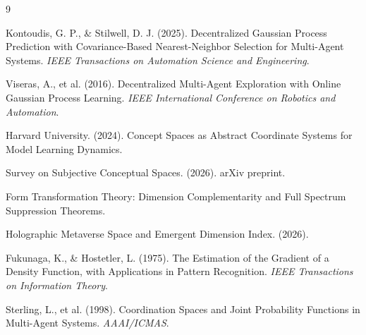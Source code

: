 \documentclass[11pt]{article}
\begin{document}
\begin{thebibliography}{9}

Kontoudis, G. P., \& Stilwell, D. J. (2025). Decentralized Gaussian Process Prediction with Covariance-Based Nearest-Neighbor Selection for Multi-Agent Systems. \textit{IEEE Transactions on Automation Science and Engineering}.

Viseras, A., et al. (2016). Decentralized Multi-Agent Exploration with Online Gaussian Process Learning. \textit{IEEE International Conference on Robotics and Automation}.

Harvard University. (2024). Concept Spaces as Abstract Coordinate Systems for Model Learning Dynamics.

Survey on Subjective Conceptual Spaces. (2026). arXiv preprint.

Form Transformation Theory: Dimension Complementarity and Full Spectrum Suppression Theorems.

Holographic Metaverse Space and Emergent Dimension Index. (2026).

Fukunaga, K., \& Hostetler, L. (1975). The Estimation of the Gradient of a Density Function, with Applications in Pattern Recognition. \textit{IEEE Transactions on Information Theory}.

Sterling, L., et al. (1998). Coordination Spaces and Joint Probability Functions in Multi-Agent Systems. \textit{AAAI/ICMAS}.

\end{thebibliography}
\end{document}
